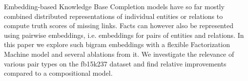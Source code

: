 Embedding-based Knowledge Base Completion models have so far mostly combined distributed representations of individual entities or relations to compute truth scores of missing links. Facts can however also be represented using pairwise embeddings, i.e. embeddings for pairs of entities and relations. In this paper we explore such bigram embeddings with a flexible Factorization Machine model and several ablations from it. We investigate the relevance of various pair types on the fb15k237 dataset and find relative improvements compared to a compositional model.
